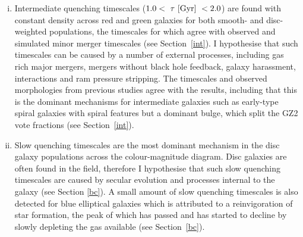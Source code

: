 \begin{enumerate}[(i)]
\item Intermediate quenching timescales ($1.0 < ~\tau~\rm{[Gyr]}~ < 2.0 $) are found with constant density across red and green galaxies for both smooth- and disc-weighted populations, the timescales for which agree with observed and simulated minor merger timescales (see Section~\ref{int}). I hypothesise that such timescales can be caused by a number of external processes, including gas rich major mergers, mergers without black hole feedback, galaxy harassment, interactions and ram pressure stripping. The timescales and observed morphologies from previous studies agree with the results, including that this is the dominant mechanisms for intermediate galaxies such as early-type spiral galaxies with spiral features but a dominant bulge, which split the GZ2 vote fractions (see Section~\ref{int}). 

\item Slow quenching timescales are the most dominant mechanism in the disc galaxy populations across the colour-magnitude diagram. Disc galaxies are often found in the field, therefore I hypothesise that such slow quenching timescales are caused by secular evolution and processes internal to the galaxy (see Section \ref{bc}). A small amount of slow quenching timescales is also detected for blue elliptical galaxies which is attributed to a reinvigoration of star formation, the peak of which has passed and has started to decline by slowly depleting the gas available (see Section~\ref{bc}). 
\end{enumerate}
